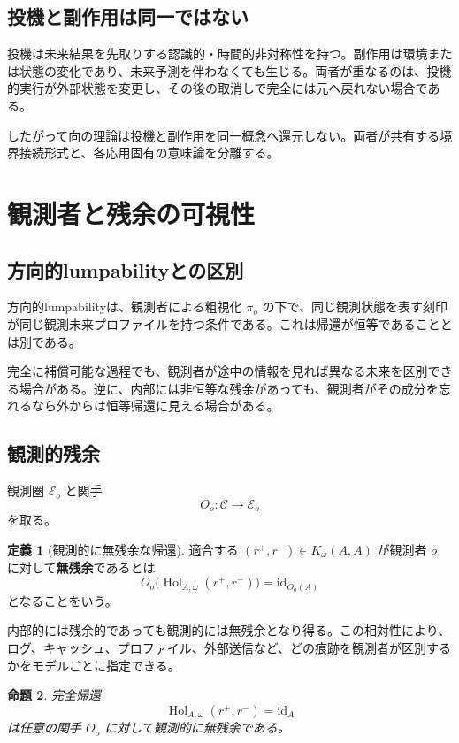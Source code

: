 \documentclass[a4paper,11pt]{ltjsarticle}
\theoremstyle{definition}
\newtheorem{definition}{定義}[section]
\theoremstyle{plain}
\newtheorem{proposition}[definition]{命題}
\newcommand{\id}{\mathrm{id}}
\newcommand{\Hol}{\operatorname{Hol}}
\begin{document}
\subsection{投機と副作用は同一ではない}

投機は未来結果を先取りする認識的・時間的非対称性を持つ。副作用は環境または状態の変化であり、未来予測を伴わなくても生じる。両者が重なるのは、投機的実行が外部状態を変更し、その後の取消しで完全には元へ戻れない場合である。

したがって向の理論は投機と副作用を同一概念へ還元しない。両者が共有する境界接続形式と、各応用固有の意味論を分離する。

\section{観測者と残余の可視性}

\subsection{方向的lumpabilityとの区別}

方向的lumpabilityは、観測者による粗視化 $\pi_o$ の下で、同じ観測状態を表す刻印が同じ観測未来プロファイルを持つ条件である\cite{ChibaDirection2026,KemenySnell1976}。これは帰還が恒等であることとは別である。

完全に補償可能な過程でも、観測者が途中の情報を見れば異なる未来を区別できる場合がある。逆に、内部には非恒等な残余があっても、観測者がその成分を忘れるなら外からは恒等帰還に見える場合がある。

\subsection{観測的残余}

観測圏 $\mathcal E_o$ と関手
\[
 O_o:\mathcal C\longrightarrow\mathcal E_o
\]
を取る。

\begin{definition}[観測的に無残余な帰還]
適合する $(r^+,r^-)\in K_\omega(A,A)$ が観測者 $o$ に対して\textbf{無残余}であるとは
\[
 O_o\bigl(\Hol_{A,\omega}(r^+,r^-)\bigr)
 =\id_{O_o(A)}
\]
となることをいう。
\end{definition}

内部的には残余的であっても観測的には無残余となり得る。この相対性により、ログ、キャッシュ、プロファイル、外部送信など、どの痕跡を観測者が区別するかをモデルごとに指定できる。

\begin{proposition}
完全帰還
\[
 \Hol_{A,\omega}(r^+,r^-)=\id_A
\]
は任意の関手 $O_o$ に対して観測的に無残余である。
\end{proposition}
\end{document}
